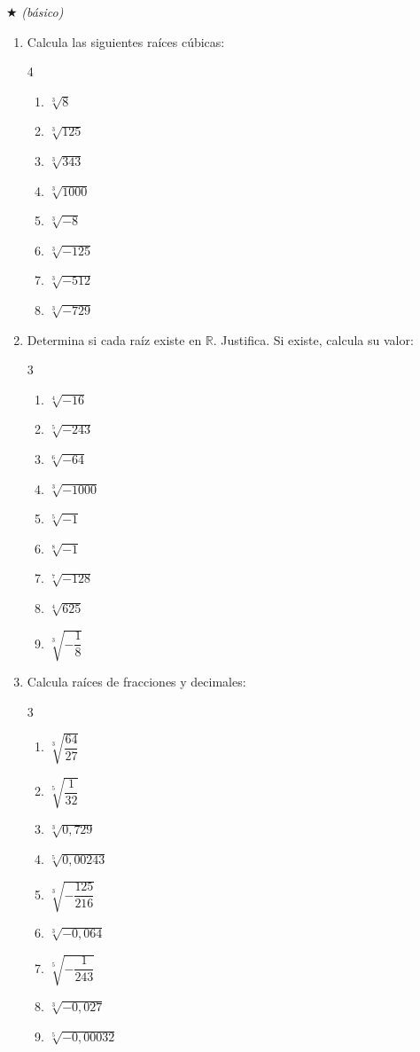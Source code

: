 \documentclass[11pt, letterpaper]{article}
\begin{document}
$\bigstar$ \textit{(básico)}

\begin{enumerate}[label=\textbf{\arabic*.}, leftmargin=*]
  \item Calcula las siguientes raíces cúbicas:
  \begin{multicols}{4}
  \begin{enumerate}[label=\alph*)]
    \item $\sqrt[3]{8}$
    \item $\sqrt[3]{125}$
    \item $\sqrt[3]{343}$
    \item $\sqrt[3]{1000}$
    \item $\sqrt[3]{-8}$
    \item $\sqrt[3]{-125}$
    \item $\sqrt[3]{-512}$
    \item $\sqrt[3]{-729}$
  \end{enumerate}
  \end{multicols}

  \item Determina si cada raíz existe en $\mathbb{R}$. Justifica. Si existe, calcula su valor:
  \begin{multicols}{3}
  \begin{enumerate}[label=\alph*)]
    \item $\sqrt[4]{-16}$
    \item $\sqrt[5]{-243}$
    \item $\sqrt[6]{-64}$
    \item $\sqrt[3]{-1000}$
    \item $\sqrt[5]{-1}$
    \item $\sqrt[8]{-1}$
    \item $\sqrt[7]{-128}$
    \item $\sqrt[4]{625}$
    \item $\sqrt[3]{-\dfrac{1}{8}}$
  \end{enumerate}
  \end{multicols}

  \item Calcula raíces de fracciones y decimales:
  \begin{multicols}{3}
  \begin{enumerate}[label=\alph*)]
    \item $\sqrt[3]{\dfrac{64}{27}}$
    \item $\sqrt[5]{\dfrac{1}{32}}$
    \item $\sqrt[3]{0{,}729}$
    \item $\sqrt[5]{0{,}00243}$
    \item $\sqrt[3]{-\dfrac{125}{216}}$
    \item $\sqrt[3]{-0{,}064}$
    \item $\sqrt[5]{-\dfrac{1}{243}}$
    \item $\sqrt[3]{-0{,}027}$
    \item $\sqrt[5]{-0{,}00032}$
  \end{enumerate}
  \end{multicols}
\end{enumerate}
\end{document}
